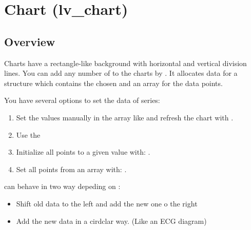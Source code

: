 \documentclass[letterpaper,10pt,english]{sphinxmanual}
\begin{document}
\section{Chart (lv\_chart)}
\label{\detokenize{object-types/chart:chart-lv-chart}}\label{\detokenize{object-types/chart::doc}}

\subsection{Overview}
\label{\detokenize{object-types/chart:overview}}
Charts have a rectangle-like background with horizontal and vertical division lines. You can add any number of  to the charts by .
It allocates data for a  structure which contains the chosen  and an array for the data points.

You have several options to set the data of series:
\begin{enumerate}
\def\theenumi{\arabic{enumi}}
\def\labelenumi{\theenumi .}
\makeatletter\def\p@enumii{\p@enumi \theenumi .}\makeatother
\item {} 
Set the values manually in the array like  and refresh the chart with .

\item {} 
Use the 

\item {} 
Initialize all points to a given value with: .

\item {} 
Set all points from an array with: .

\end{enumerate}

 can behave in two way depeding on :
\begin{itemize}
\item {} 
 Shift old data to the left and add the new one o the right

\item {} 
 Add the new data in a cirdclar way. (Like an ECG diagram)

\end{itemize}
\end{document}
